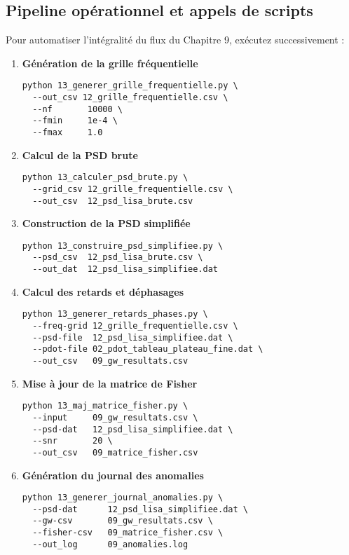 \subsection{Pipeline opérationnel et appels de scripts}
Pour automatiser l’intégralité du flux du Chapitre 9, exécutez successivement :

\begin{enumerate}
  \item \textbf{Génération de la grille fréquentielle}
    \begin{verbatim}
python 13_generer_grille_frequentielle.py \
  --out_csv 12_grille_frequentielle.csv \
  --nf       10000 \
  --fmin     1e-4 \
  --fmax     1.0
    \end{verbatim}

  \item \textbf{Calcul de la PSD brute}
    \begin{verbatim}
python 13_calculer_psd_brute.py \
  --grid_csv 12_grille_frequentielle.csv \
  --out_csv  12_psd_lisa_brute.csv
    \end{verbatim}

  \item \textbf{Construction de la PSD simplifiée}
    \begin{verbatim}
python 13_construire_psd_simplifiee.py \
  --psd_csv  12_psd_lisa_brute.csv \
  --out_dat  12_psd_lisa_simplifiee.dat
    \end{verbatim}

  \item \textbf{Calcul des retards et déphasages}
    \begin{verbatim}
python 13_generer_retards_phases.py \
  --freq-grid 12_grille_frequentielle.csv \
  --psd-file  12_psd_lisa_simplifiee.dat \
  --pdot-file 02_pdot_tableau_plateau_fine.dat \
  --out_csv   09_gw_resultats.csv
    \end{verbatim}

  \item \textbf{Mise à jour de la matrice de Fisher}
    \begin{verbatim}
python 13_maj_matrice_fisher.py \
  --input     09_gw_resultats.csv \
  --psd-dat   12_psd_lisa_simplifiee.dat \
  --snr       20 \
  --out_csv   09_matrice_fisher.csv
    \end{verbatim}

  \item \textbf{Génération du journal des anomalies}
    \begin{verbatim}
python 13_generer_journal_anomalies.py \
  --psd-dat      12_psd_lisa_simplifiee.dat \
  --gw-csv       09_gw_resultats.csv \
  --fisher-csv   09_matrice_fisher.csv \
  --out_log      09_anomalies.log
    \end{verbatim}


\end{enumerate}
